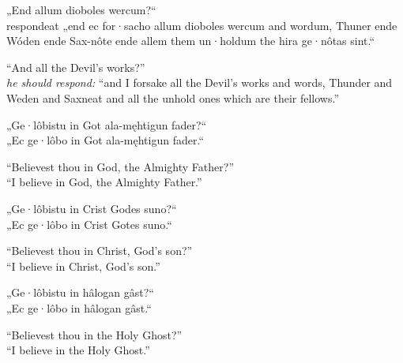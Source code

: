 \bpg\bpa%
„End allum dioboles wercum?“ \\
respondeat „end ec for·sacho allum dioboles wercum and wordum, Thuner ende Wóden ende Sax-nôte ende allem them un·holdum the hira ge·nôtas sint.“\epa

\bpb “And all the Devil’s works?” \\
\emph{he should respond:} “and I forsake all the Devil’s works and words, Thunder and Weden and Saxneat and all the unhold ones which are their fellows.”\epb\epg


\bpg\bpa%
„Ge·lôbistu in Got ala-męhtigun fader?“ \\
„Ec ge·lôbo in Got ala-męhtigun fader.“\epa

\bpb “Believest thou in God, the Almighty Father?” \\
“I believe in God, the Almighty Father.”\epb\epg


\bpg\bpa%
„Ge·lôbistu in Crist Godes suno?“ \\
„Ec ge·lôbo in Crist Gotes suno.“\epa

\bpb “Believest thou in Christ, God’s son?” \\
“I believe in Christ, God’s son.”\epb\epg


\bpg\bpa%
„Ge·lôbistu in hâlogan gâst?“ \\
„Ec ge·lôbo in hâlogan gâst.“\epa

\bpb “Believest thou in the Holy Ghost?” \\
“I believe in the Holy Ghost.”\epb\epg

\sectionline
